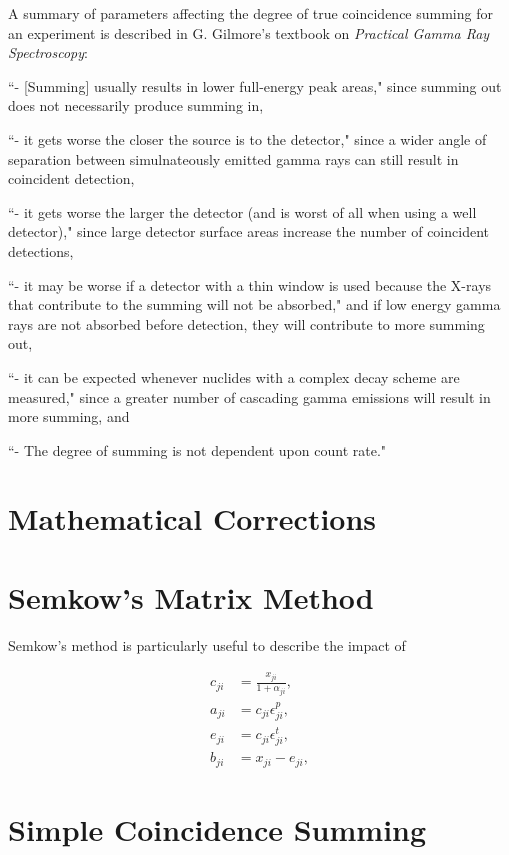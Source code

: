 \documentclass[12pt,twoside]{reedthesis}
\begin{document}
A summary of parameters affecting the degree of true coincidence summing for an experiment is described in G. Gilmore's textbook on \textit{Practical Gamma Ray Spectroscopy}:

``- [Summing] usually results in lower full-energy peak areas," since summing out does not necessarily produce summing in,

``- it gets worse the closer the source is to the detector," since a wider angle of separation between simulnateously emitted gamma rays can still result in coincident detection,

``- it gets worse the larger the detector (and is worst of all when using a well detector)," since large detector surface areas increase the number of coincident detections,

``- it may be worse if a detector with a thin window is used because the X-rays that contribute to the summing will not be absorbed," and if low energy gamma rays are not absorbed before detection, they will contribute to more summing out,

``- it can be expected whenever nuclides with a complex decay scheme are measured," since a greater number of cascading gamma emissions will result in more summing, and

``- The degree of summing is not dependent upon count rate." \cite{Gilmore}

\section{Mathematical Corrections}

\section{Semkow's Matrix Method}

Semkow's method is particularly useful to describe the impact of 

\begin{align}
c_{ji} &= \frac{x_{ji}}{1+\alpha_{ji}},\\
a_{ji} &= c_{ji}\epsilon^{p}_{ji},\\
e_{ji} &= c_{ji}\epsilon^{t}_{ji},\\
b_{ji} &= x_{ji}-e_{ji},
\label{Sdefinitions}
\end{align}

\section{Simple Coincidence Summing}
\end{document}
